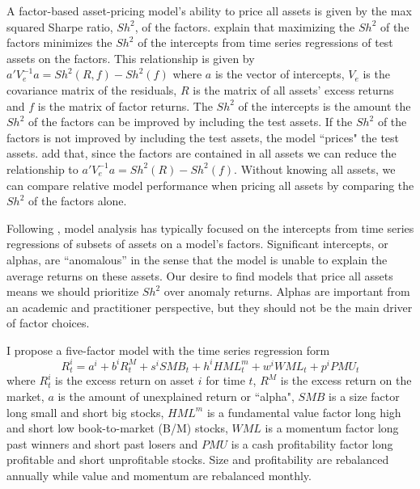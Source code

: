 

A factor-based asset-pricing model’s ability to price all assets is given by the max
squared Sharpe ratio, $Sh^2$, of the factors. \textcite{gibbons1989test} explain that
maximizing the $Sh^2$ of the factors minimizes the $Sh^2$ of the intercepts from time
series regressions of test assets on the factors. This relationship is given by
$a'V_e^{-1}a=Sh^2(R, f) -Sh^2(f)$ where $a$ is the vector of intercepts, $V_e$ is the
covariance matrix of the residuals, $R$ is the matrix of all assets’ excess returns and
$f$ is the matrix of factor returns. The $Sh^2$ of the intercepts is the amount the $Sh^2$
of the factors can be improved by including the test assets. If the $Sh^2$ of the factors
is not improved by including the test assets, the model ``prices" the test assets.
\textcite{barillas2016alpha} add that, since the factors are contained in all assets we
can reduce the relationship to $a'V_e^{-1}a = Sh^2(R)-Sh^2(f)$. Without knowing all
assets, we can compare relative model performance when pricing all assets by comparing the
$Sh^2$ of the factors alone.

Following \textcite{jensen1968performance}, model analysis has typically focused on the
intercepts from time series regressions of subsets of assets on a model’s factors.
Significant intercepts, or alphas, are ``anomalous” in the sense that the model is unable
to explain the average returns on these assets. Our desire to find models that price all
assets means we should prioritize $Sh^2$ over anomaly returns. Alphas are important from
an academic and practitioner perspective, but they should not be the main driver of factor
choices.

I propose a five-factor model with the time series regression form
\begin{equation}
\label{eq:m1}
R_t^i=a^i+b^iR_t^M+s^iSMB_t+h^iHML_t^m+w^iWML_t+p^iPMU_t
\end{equation}
where
$R_t^i$ is the excess return on asset $i$ for time $t$,
$R^M$ is the excess return on the market,
$a$ is the amount of unexplained return or ``alpha",
$SMB$ is a size factor long small and short big stocks,
$HML^m$ is a fundamental value factor long high and short low book-to-market (B/M) stocks,
$WML$ is a momentum factor long past winners and short past losers and
$PMU$ is a cash profitability factor long profitable and short unprofitable stocks.
Size and profitability are rebalanced annually while value and momentum are rebalanced monthly.

